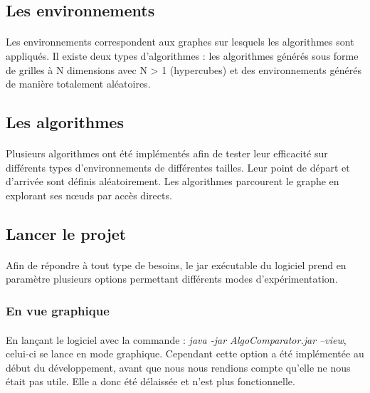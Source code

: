\documentclass[pidr]{tnreport}
\begin{document}
			\subsection{Les environnements}

\paragraph{}
Les environnements correspondent aux graphes sur lesquels les algorithmes sont appliqués. Il existe deux types d'algorithmes : les algorithmes générés sous forme de grilles à N dimensions avec N > 1 (hypercubes) et des environnements générés de manière totalement aléatoires.
			
			\subsection{Les algorithmes}
				
\paragraph{}
Plusieurs algorithmes ont été implémentés afin de tester leur efficacité sur différents types d'environnements de différentes tailles. Leur point de départ et d'arrivée sont définis aléatoirement. Les algorithmes parcourent le graphe en explorant ses nœuds par accès directs.
		
							
		\subsection{Lancer le projet}

\paragraph{}
Afin de répondre à tout type de besoins, le jar exécutable du logiciel prend en paramètre plusieurs options permettant différents modes d'expérimentation.

			\subsubsection{En vue graphique}

\paragraph{}
En lançant le logiciel avec la commande : \emph{java -jar AlgoComparator.jar --view}, celui-ci se lance en mode graphique. Cependant cette option a été implémentée au début du développement, avant que nous nous rendions compte qu'elle ne nous était pas utile. Elle a donc été délaissée et n'est plus fonctionnelle.
\end{document}
